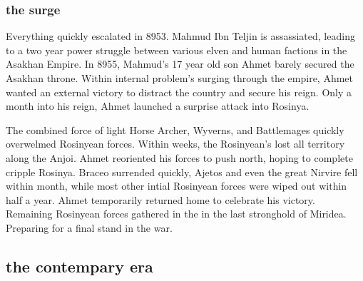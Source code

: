 \documentclass[../main.tex]{subfiles}
\begin{document}
\subsubsection{the surge}
Everything quickly escalated in 8953. Mahmud Ibn Teljin is assassiated, leading to a two year power struggle 
between various elven and human factions in the Asakhan Empire. In 8955, Mahmud's 17 year old son Ahmet
barely secured the Asakhan throne. Within internal problem's surging through the empire, Ahmet wanted an
external victory to distract the country and secure his reign. Only a month into his reign, Ahmet launched
a surprise attack into Rosinya. 

The combined force of light Horse Archer, Wyverns, and Battlemages quickly overwelmed Rosinyean forces.
Within weeks, the Rosinyean's lost all territory along the Anjoi. Ahmet reoriented his forces to push
north, hoping to complete cripple Rosinya. Braceo surrended quickly, Ajetos and even the great Nirvire
fell within month, while most other intial Rosinyean forces were wiped out within half a year. 
Ahmet temporarily returned home to celebrate his victory. Remaining Rosinyean forces gathered in the 
in the last stronghold of Miridea. Preparing for a final stand in the war.  


\subsection{the contempary era}
\end{document}
